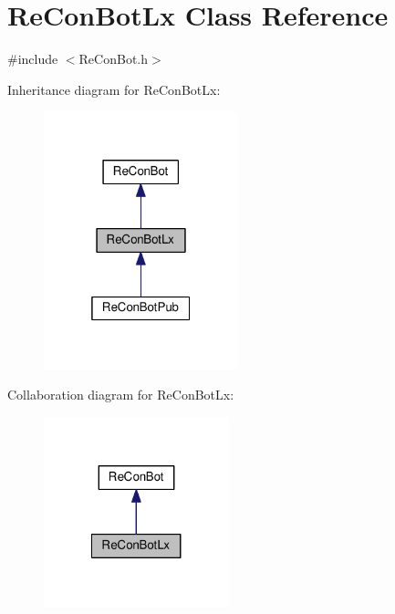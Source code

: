 \hypertarget{class_re_con_bot_lx}{}\section{Re\+Con\+Bot\+Lx Class Reference}
\label{class_re_con_bot_lx}


{\ttfamily \#include $<$Re\+Con\+Bot.\+h$>$}



Inheritance diagram for Re\+Con\+Bot\+Lx\+:\nopagebreak
\begin{figure}[H]
\begin{center}
\leavevmode
\includegraphics[width=160pt]{dc/db8/class_re_con_bot_lx__inherit__graph}
\end{center}
\end{figure}


Collaboration diagram for Re\+Con\+Bot\+Lx\+:\nopagebreak
\begin{figure}[H]
\begin{center}
\leavevmode
\includegraphics[width=152pt]{d3/dfa/class_re_con_bot_lx__coll__graph}
\end{center}
\end{figure}
